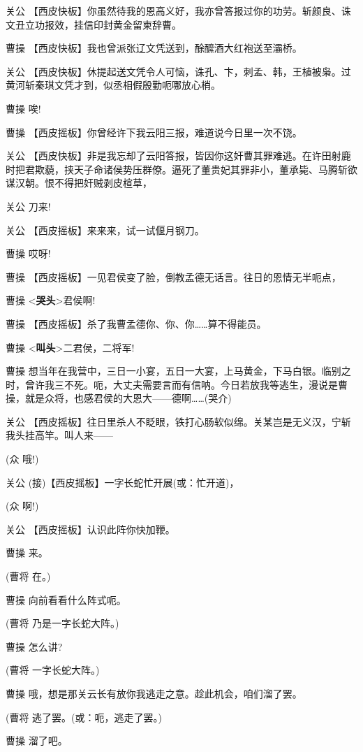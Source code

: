 关公
【西皮快板】你虽然待我的恩高义好，我亦曾答报过你的功劳。斩颜良、诛文丑立功报效，挂信印封黄金留柬辞曹。

曹操 【西皮快板】我也曾派张辽文凭送到，酴醿酒大红袍送至灞桥。

关公
【西皮快板】休提起送文凭令人可恼，诛孔、卞，刺孟、韩，王植被枭。过黄河斩秦琪文凭才到，似丞相假殷勤呃哪放心梢。

曹操 唉!

曹操 【西皮摇板】你曾经许下我云阳三报，难道说今日里一次不饶。

关公
【西皮快板】非是我忘却了云阳答报，皆因你这奸曹其罪难逃。在许田射鹿时把君欺藐，挟天子命诸侯势压群僚。逼死了董贵妃其罪非小，董承毙、马腾斩欲谋汉朝。恨不得把奸贼剥皮楦草，

关公 刀来!

关公 【西皮摇板】来来来，试一试偃月钢刀。

曹操 哎呀!

曹操 【西皮摇板】一见君侯变了脸，倒教孟德无话言。往日的恩情无半呃点，

曹操 \textless{}\textbf{哭头}\textgreater{}君侯啊!

曹操 【西皮摇板】杀了我曹孟德你、你、你\ldots{}\ldots{}算不得能员。

曹操 \textless{}\textbf{叫头}\textgreater{}二君侯，二将军!

曹操
想当年在我营中，三日一小宴，五日一大宴，上马黄金，下马白银。临别之时，曾许我三不死。呃，大丈夫需要言而有信呐。今日若放我等逃生，漫说是曹操，就是众将，也感君侯的大恩大------德啊\ldots{}\ldots{}(哭介)

关公
【西皮摇板】往日里杀人不眨眼，铁打心肠软似绵。关某岂是无义汉，宁斩我头挂高竿。叫人来------

(众 哦!)

关公 (接)【西皮摇板】一字长蛇忙开展(或：忙开道)，

(众 啊!)

关公 【西皮摇板】认识此阵你快加鞭。

曹操 来。

(曹将 在。)

曹操 向前看看什么阵式呃。

(曹将 乃是一字长蛇大阵。)

曹操 怎么讲?

(曹将 一字长蛇大阵。)

曹操 哦，想是那关云长有放你我逃走之意。趁此机会，咱们溜了罢。

(曹将 逃了罢。(或：呃，逃走了罢。)

曹操 溜了吧。

